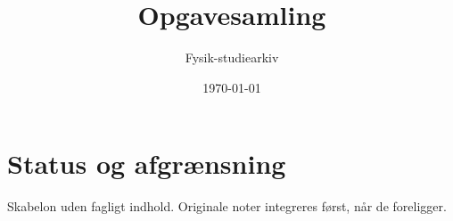 \documentclass[11pt,a4paper,oneside]{book}
\begin{document}
\title{Opgavesamling}
\author{Fysik-studiearkiv}\date{\today}\maketitle\tableofcontents
\chapter{Status og afgrænsning}
Skabelon uden fagligt indhold. Originale noter integreres først, når de foreligger.
\end{document}
